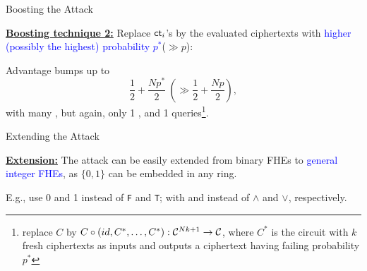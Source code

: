 \documentclass{beamer}
\begin{document}
	\begin{frame}{Boosting the \indcpad Attack}
 
    {
    \underline{\bf Boosting technique 2:} Replace ${\sf ct}_i$'s by the evaluated ciphertexts with \textcolor{blue}{higher (possibly the highest) probability $p^*$}($\gg p$): \pause\vspace{0.3cm}
    
    Advantage bumps up to $$\frac{1}{2} + \frac{Np^*}{2} ~ \left(\gg \frac{1}{2} + \frac{Np}{2}\right),$$
    with many \enc, but again, only 1 \eval, and 1 \dec queries\footnote{replace $C$ by $C \circ (id, C^*, \dots, C^*): {\mathcal C}^{Nk+1} \rightarrow {\mathcal C}$, where $C^*$ is the circuit with $k$ fresh ciphertexts as inputs and outputs a ciphertext having failing probability $p^*$}.
    }
	\end{frame}

	\begin{frame}{Extending the \indcpad Attack}
 
    {
    \underline{\bf Extension:} The attack can be easily extended from binary FHEs to \textcolor{blue}{general integer FHEs}, as $\{0, 1\}$ can be embedded in any ring.\vspace{0.5cm}\pause
    
    E.g., use 0 and 1 instead of \texttt{F} and \texttt{T}; with \mult and \add instead of $\wedge$ and $\vee$, respectively. 
    }
	\end{frame}
\end{document}
